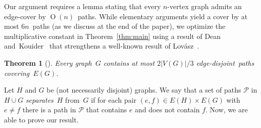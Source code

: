 \documentclass{aic}
\newcommand{\defi}[1]{\emph{#1}}
\DeclareMathOperator{\bigoh}{\mathrm{O}}
\newtheorem{theorem}{Theorem}
\begin{document}
Our argument requires a lemma stating that every $n$-vertex graph admits an edge-cover
by $\bigoh(n)$~paths.
  While elementary arguments yield a cover by at most \(6n\)~paths
  (as we discuss at the end of the paper),
  we optimize the multiplicative constant in Theorem~\ref{thm:main}
  using a result of Dean and~Kouider~\cite{dean2000gallai}
  that strengthens a well-known result of Lovász~\cite{lovasz1968covering}.

\begin{theorem}[\cite{dean2000gallai}]\label{thm:dean-kouider}
  Every graph~$G$ contains at most \(2|V(G)|/3\) edge-disjoint~paths covering~$E(G)$.
\end{theorem}

Let \(H\) and \(G\) be (not necessarily disjoint) graphs.
We say that a set of paths \(\mathcal{P}\) in \(H \cup G\) \defi{separates}~\(H\) from~\(G\)
if for each pair \((e,f) \in E(H) \times E(G)\) with \(e \ne f\)
there is a path in \(\mathcal{P}\) that contains \(e\) and does not contain \(f\).
Now, we are able to prove our result.
\end{document}
